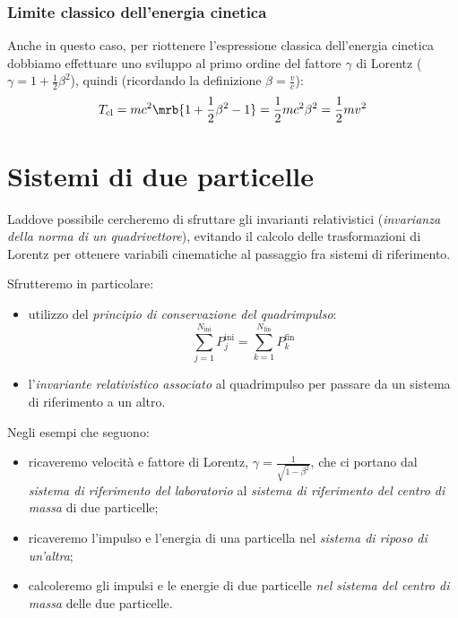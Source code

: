 \subsubsection{Limite classico dell'energia cinetica}
Anche in questo caso, per riottenere l'espressione classica dell'energia
cinetica dobbiamo effettuare uno sviluppo al primo ordine del fattore $\gamma$
di Lorentz ($\gamma = 1 + \frac{1}{2}\beta^2$), quindi (ricordando la
definizione $\beta = \frac{v}{c}$):
\begin{equation}
  T_{\text{cl}} = mc^2\mrb{1+ \frac{1}{2}\beta^2 - 1} = \frac{1}{2}mc^2\beta^2 =
  \frac{1}{2}mv^2
\end{equation}

\section{Sistemi di due particelle}
Laddove possibile cercheremo di sfruttare gli invarianti relativistici
(\textit{invarianza della norma di un quadrivettore}), evitando il calcolo
delle trasformazioni di Lorentz per ottenere variabili cinematiche al passaggio
fra sistemi di riferimento.

Sfrutteremo in particolare:
\begin{itemize}
  \item utilizzo del \textit{principio di conservazione del quadrimpulso}:
    \begin{equation}
      \sum_{j=1}^{N_{\text{ini}}} P_j^{\text{ini}}
      = \sum_{k=1}^{N_{\text{fin}}} P_k^{\text{fin}}
    \end{equation}
  \item l'\textit{invariante relativistico associato} al quadrimpulso per
    passare da un sistema di riferimento a un altro.
\end{itemize}
Negli esempi che seguono:
\begin{itemize}
  \item ricaveremo velocità e fattore di Lorentz,
    $\gamma = \frac{1}{\sqrt{1 - \beta^2}}$, che ci portano dal \textit{sistema
    di riferimento del laboratorio} al \textit{sistema di riferimento del 
    centro di massa} di due particelle;
  \item ricaveremo l'impulso e l'energia di una particella nel \textit{sistema
    di riposo di un'altra};
  \item calcoleremo gli impulsi e le energie di due particelle \textit{nel
    sistema del centro di massa} delle due particelle.
\end{itemize}

